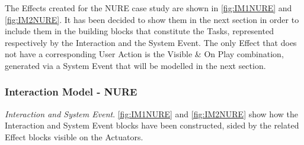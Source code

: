 The Effects created for the NURE case study are shown in \autoref{fig:IM1NURE} and \autoref{fig:IM2NURE}. It has been decided to show them in the next section in order to include them in the building blocks that constitute the Tasks, represented respectively by the Interaction and the System Event. 
The only Effect that does not have a corresponding User Action is the Visible \& On Play combination, generated via a System Event that will be modelled in the next section. 

\subsubsection*{Interaction Model - NURE}

\emph{Interaction and System Event}. \autoref{fig:IM1NURE} and \autoref{fig:IM2NURE} show how the Interaction and System Event blocks have been constructed, sided by the related Effect blocks visible on the Actuators. 

